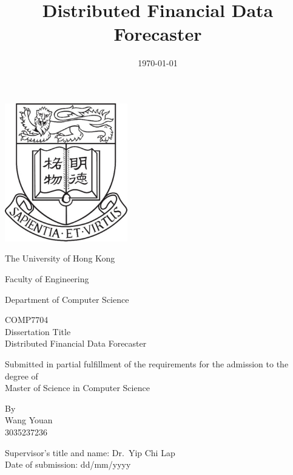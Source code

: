 \documentclass[a4paper, 12pt, oneside]{Thesis}  %
\begin{document}
\frontmatter      %

\title  {Distributed Financial Data Forecaster}
\addresses  {\groupname\\\deptname\\\univname}  %
\date       {\today}
\subject    {Computer Science}

\begin{titlepage}
	\centering
	\includegraphics[width=0.4\textwidth]{hku-logo.png}\par\vspace{0.5cm}
	The University of Hong Kong \par
	Faculty of Engineering \par
	Department of Computer Science \par
	\vspace{1cm}
	COMP7704\\
	Dissertation Title\\
	Distributed Financial Data Forecaster\par
	\vspace{1cm}
	Submitted in partial fulfillment of the requirements for the admission to the degree of\\ 
	Master of Science in Computer Science\par
	\vfill
	By\\
	Wang Youan\\
	3035237236\par
	Supervisor's title and name: Dr.~Yip Chi Lap\\
	Date of submission: dd/mm/yyyy
\end{titlepage}
\end{document}
